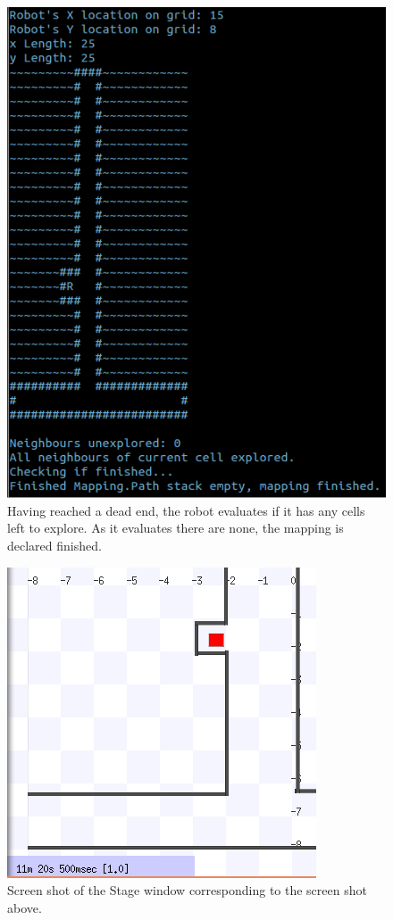 \documentclass[a4paper,12pt]{article}
\begin{document}
\begin{figure}[H]
\includegraphics[scale=1.0]{RunT5.png}
\caption{Having reached a dead end, the robot evaluates if it has any cells left to explore. As it evaluates there are none, the mapping is declared finished.}
\end{figure}

\begin{figure}[H]
\includegraphics[scale=0.9]{RunS5.png}
\caption{Screen shot of the Stage window corresponding to the screen shot above.}
\end{figure}
\end{document}
